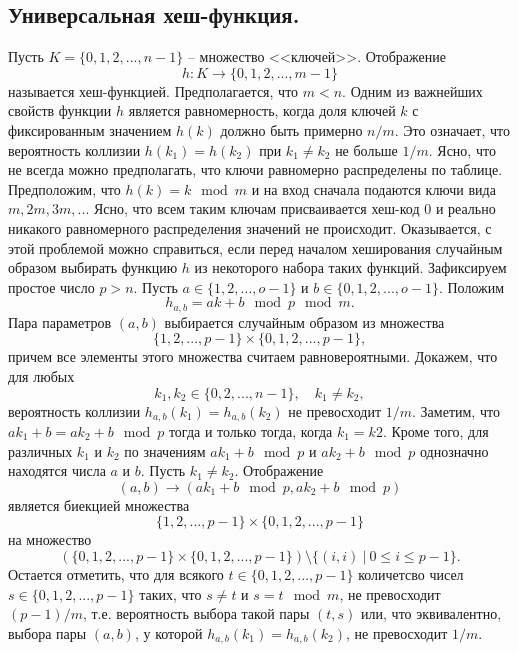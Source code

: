 \subsection{Универсальная хеш-функция.}
Пусть $K = \{0,1,2,...,n-1\}$ -- множество <<ключей>>. Отображение
\[
h: K \to \{0,1,2,...,m-1\}
\]
называется хеш-функцией. Предполагается, что $m < n$. Одним из важнейших свойств функции $h$ является равномерность, когда доля ключей $k$ с фиксированным значением $h(k)$ должно быть примерно $n/m$.  Это означает, что вероятность коллизии $h(k_1) = h(k_2)$ при $k_1 \neq k_2$ не больше $1/m$. Ясно, что не всегда можно предполагать, что ключи равномерно распределены по таблице. Предположим, что $h(k) = k \mod{m}$ и на вход сначала подаются ключи вида $m, 2m, 3m, ...$ Ясно, что всем таким ключам присваивается хеш-код 0 и реально никакого равномерного распределения значений не происходит. Оказывается, с этой проблемой можно справиться, если перед началом хеширования случайным образом выбирать функцию $h$ из некоторого набора таких функций.
\newline
Зафиксируем простое число $p > n$. Пусть $a \in \{1,2,...,o-1\}$ и $b \in \{0,1,2,...,o-1\}$. Положим $$h_{a,b} = ak + b \mod{p} \mod{m}.$$
Пара параметров $(a,b)$ выбирается случайным образом из множества $$\{1,2,...,p-1\} \times \{0,1,2,...,p-1\},$$ причем все элементы этого множества считаем равновероятными. Докажем, что для любых $$k_1, k_2 \in \{0,2,...,n-1\}, \quad k_1 \neq k_2,$$ вероятность коллизии $h_{a,b}(k_1) = h_{a,b}(k_2)$ не превосходит $1/m$.
\newline
Заметим, что $ak_1 + b = ak_2 + b \mod{p}$ тогда и только тогда, когда $k_1 = k2$. Кроме того, для различных $k_1$ и $k_2$ по значениям $ak_1 + b \mod{p}$ и $ak_2 + b \mod{p}$ однозначно находятся числа $a$ и $b$. Пусть $k_1 \neq k_2$. Отображение
$$(a,b) \to (ak_1 + b \mod{p}, ak_2 + b \mod{p})$$ является биекцией множества
$$\{1,2,...,p-1\} \times \{0,1,2,...,p-1\}$$ на множество 
$$(\{0, 1,2,...,p-1\} \times \{0,1,2,...,p-1\}) \setminus \{(i, i) \> | \> 0 \leqslant i \leqslant p - 1 \}.$$ Остается отметить, что для всякого $t \in \{0,1,2,...,p-1\}$ количетсво чисел $s \in \{0,1,2,...,p-1\}$ таких, что $s \neq t$ и $s = t \mod{m}$, не превосходит $(p-1)/m$, т.е. вероятность выбора такой пары $(t,s)$ или, что эквивалентно, выбора пары $(a,b)$, у которой $h_{a,b}(k_1) = h_{a,b}(k_2)$, не превосходит $1/m$.